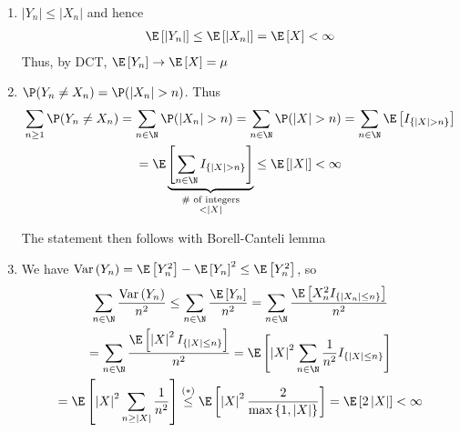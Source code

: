 \par\bigskip
\begin{prf}[]{}
  \begin{enumerate}[leftmargin=*]
    \item $\left|Y_n\right|\leq \left|X_n\right|$ and hence
      \begin{equation*}
        \begin{gathered}
          \E\left[\left|Y_n\right|\right]\leq \E\left[\left|X_n\right|\right] = \E\left[X\right]<\infty
        \end{gathered}
      \end{equation*}
      \noindent Thus, by DCT, $\E\left[Y_n\right]\to \E\left[X\right] = \mu$
      \par\bigskip
    \item $\P(Y_n\neq X_n) = \P(\left|X_n\right|>n)$. Thus
      \begin{equation*}
        \begin{gathered}
          \sum_{n\geq 1}\P(Y_n\neq X_n) = \sum_{n\in\N}\P(\left|X_n\right|>n) = \sum_{n\in\N}\P(\left|X\right|>n) = \sum_{n\in\N}\E\left[I_{\left\{\left|X\right|>n\right\}}\right]\\
          = \E\underbrace{\left[\sum_{n\in\N}I_{\left\{\left|X\right|>n\right\}}\right]}_{\substack{\text{\# of integers}\\<\left|X\right|}}\leq \E\left[\left|X\right|\right]<\infty
        \end{gathered}
      \end{equation*}\par
      \noindent The statement then follows with Borell-Canteli lemma
      \par\bigskip
    \item We have $\text{Var}\left(Y_n\right) = \E\left[Y_n^2\right]-\E\left[Y_n\right]^2\leq \E\left[Y_n^2\right]$, so 
      \begin{equation*}
        \begin{gathered}
          \sum_{n\in\N}\dfrac{\text{Var}\left(Y_n\right)}{n^2}\leq \sum_{n\in\N}\dfrac{\E\left[Y_n\right]}{n^2} = \sum_{n\in\N}\dfrac{\E\left[X_n^2I_{\left\{\left|X_n\right|\leq n\right\}}\right]}{n^2}\\
          =\sum_{n\in\N}\dfrac{\E\left[\left|X\right|^2I_{\left\{\left|X\right|\leq n\right\}}\right]}{n^2} = \E\left[\left|X\right|^2\sum_{n\in\N}\dfrac{1}{n^2}I_{\left\{\left|X\right|\leq n\right\}}\right]\\
          = \E\left[\left|X\right|^2\sum_{n\geq\left|X\right|}\dfrac{1}{n^2}\right]\stackrel{(*)}{\leq}\E\left[\left|X\right|^2\dfrac{2}{\max\left\{1,\left|X\right|\right\}}\right] = \E\left[2\left|X\right|\right]<\infty

\end{gathered}
\end{equation*}
\end{enumerate}
\end{prf}
